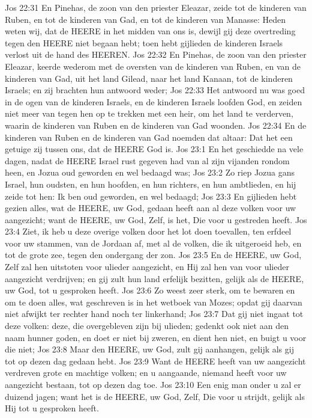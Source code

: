 Jos 22:31  En Pinehas, de zoon van den priester Eleazar, zeide tot de kinderen van Ruben, en tot de kinderen van Gad, en tot de kinderen van Manasse: Heden weten wij, dat de HEERE in het midden van ons is, dewijl gij deze overtreding tegen den HEERE niet begaan hebt; toen hebt gijlieden de kinderen Israels verlost uit de hand des HEEREN.
Jos 22:32  En Pinehas, de zoon van den priester Eleazar, keerde wederom met de oversten van de kinderen van Ruben, en van de kinderen van Gad, uit het land Gilead, naar het land Kanaan, tot de kinderen Israels; en zij brachten hun antwoord weder;
Jos 22:33  Het antwoord nu was goed in de ogen van de kinderen Israels, en de kinderen Israels loofden God, en zeiden niet meer van tegen hen op te trekken met een heir, om het land te verderven, waarin de kinderen van Ruben en de kinderen van Gad woonden.
Jos 22:34  En de kinderen van Ruben en de kinderen van Gad noemden dat altaar: Dat het een getuige zij tussen ons, dat de HEERE God is.
Jos 23:1  En het geschiedde na vele dagen, nadat de HEERE Israel rust gegeven had van al zijn vijanden rondom heen, en Jozua oud geworden en wel bedaagd was;
Jos 23:2  Zo riep Jozua gans Israel, hun oudsten, en hun hoofden, en hun richters, en hun ambtlieden, en hij zeide tot hen: Ik ben oud geworden, en wel bedaagd;
Jos 23:3  En gijlieden hebt gezien alles, wat de HEERE, uw God, gedaan heeft aan al deze volken voor uw aangezicht; want de HEERE, uw God, Zelf, is het, Die voor u gestreden heeft.
Jos 23:4  Ziet, ik heb u deze overige volken door het lot doen toevallen, ten erfdeel voor uw stammen, van de Jordaan af, met al de volken, die ik uitgeroeid heb, en tot de grote zee, tegen den ondergang der zon.
Jos 23:5  En de HEERE, uw God, Zelf zal hen uitstoten voor ulieder aangezicht, en Hij zal hen van voor ulieder aangezicht verdrijven; en gij zult hun land erfelijk bezitten, gelijk als de HEERE, uw God, tot u gesproken heeft.
Jos 23:6  Zo weest zeer sterk, om te bewaren en om te doen alles, wat geschreven is in het wetboek van Mozes; opdat gij daarvan niet afwijkt ter rechter hand noch ter linkerhand;
Jos 23:7  Dat gij niet ingaat tot deze volken: deze, die overgebleven zijn bij ulieden; gedenkt ook niet aan den naam hunner goden, en doet er niet bij zweren, en dient hen niet, en buigt u voor die niet;
Jos 23:8  Maar den HEERE, uw God, zult gij aanhangen, gelijk als gij tot op dezen dag gedaan hebt.
Jos 23:9  Want de HEERE heeft van uw aangezicht verdreven grote en machtige volken; en u aangaande, niemand heeft voor uw aangezicht bestaan, tot op dezen dag toe.
Jos 23:10  Een enig man onder u zal er duizend jagen; want het is de HEERE, uw God, Zelf, Die voor u strijdt, gelijk als Hij tot u gesproken heeft.
